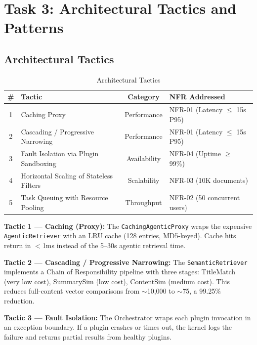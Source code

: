 \documentclass[11pt,a4paper]{article}
\begin{document}
\section{Task 3: Architectural Tactics and Patterns}

\subsection{Architectural Tactics}

\begin{table}[H]
\centering
\small
\begin{tabularx}{\textwidth}{clcX}
\toprule
\textbf{\#} & \textbf{Tactic} & \textbf{Category} & \textbf{NFR Addressed} \\
\midrule
1 & Caching Proxy & Performance & NFR-01 (Latency $\leq$ 15s P95) \\
2 & Cascading / Progressive Narrowing & Performance & NFR-01 (Latency $\leq$ 15s P95) \\
3 & Fault Isolation via Plugin Sandboxing & Availability & NFR-04 (Uptime $\geq$ 99\%) \\
4 & Horizontal Scaling of Stateless Filters & Scalability & NFR-03 (10K documents) \\
5 & Task Queuing with Resource Pooling & Throughput & NFR-02 (50 concurrent users) \\
\bottomrule
\end{tabularx}
\caption{Architectural Tactics}
\end{table}

\textbf{Tactic 1 --- Caching (Proxy):} The \texttt{CachingAgenticProxy} wraps the expensive \texttt{AgenticRetriever} with an LRU cache (128 entries, MD5-keyed). Cache hits return in $<$1ms instead of the 5--30s agentic retrieval time.

\textbf{Tactic 2 --- Cascading / Progressive Narrowing:} The \texttt{SemanticRetriever} implements a Chain of Responsibility pipeline with three stages: TitleMatch (very low cost), SummarySim (low cost), ContentSim (medium cost). This reduces full-content vector comparisons from $\sim$10,000 to $\sim$75, a 99.25\% reduction.

\textbf{Tactic 3 --- Fault Isolation:} The Orchestrator wraps each plugin invocation in an exception boundary. If a plugin crashes or times out, the kernel logs the failure and returns partial results from healthy plugins.
\end{document}
